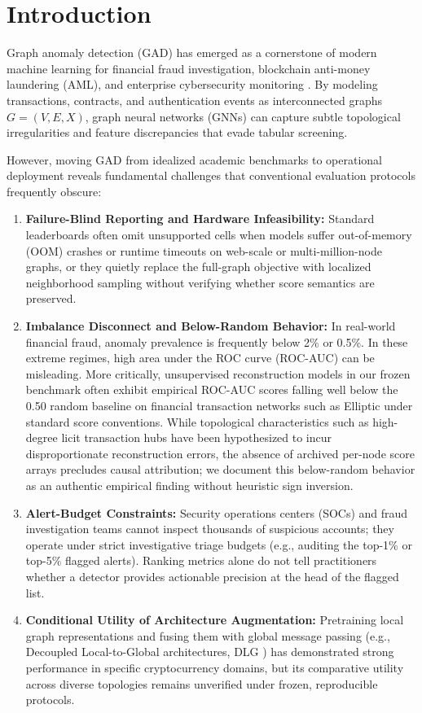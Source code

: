 \documentclass[applsci,article,submit,moreauthors,pdftex]{Definitions/mdpi}
\begin{document}
\section{Introduction}
\label{sec:introduction}
Graph anomaly detection (GAD) has emerged as a cornerstone of modern machine learning for financial fraud investigation, blockchain anti-money laundering (AML), and enterprise cybersecurity monitoring \cite{ma2023survey,qiao2025survey,dilini2026comprehensive}. By modeling transactions, contracts, and authentication events as interconnected graphs $G=(V, E, X)$, graph neural networks (GNNs) can capture subtle topological irregularities and feature discrepancies that evade tabular screening.

However, moving GAD from idealized academic benchmarks to operational deployment reveals fundamental challenges that conventional evaluation protocols frequently obscure:
\begin{enumerate}
    \item \textbf{Failure-Blind Reporting and Hardware Infeasibility:} Standard leaderboards often omit unsupported cells when models suffer out-of-memory (OOM) crashes or runtime timeouts on web-scale or multi-million-node graphs, or they quietly replace the full-graph objective with localized neighborhood sampling without verifying whether score semantics are preserved.
    \item \textbf{Imbalance Disconnect and Below-Random Behavior:} In real-world financial fraud, anomaly prevalence is frequently below 2\% or 0.5\%. In these extreme regimes, high area under the ROC curve (ROC-AUC) can be misleading. More critically, unsupervised reconstruction models in our frozen benchmark often exhibit empirical ROC-AUC scores falling well below the 0.50 random baseline on financial transaction networks such as Elliptic under standard score conventions. While topological characteristics such as high-degree licit transaction hubs have been hypothesized to incur disproportionate reconstruction errors, the absence of archived per-node score arrays precludes causal attribution; we document this below-random behavior as an authentic empirical finding without heuristic sign inversion.
    \item \textbf{Alert-Budget Constraints:} Security operations centers (SOCs) and fraud investigation teams cannot inspect thousands of suspicious accounts; they operate under strict investigative triage budgets (e.g., auditing the top-1\% or top-5\% flagged alerts). Ranking metrics alone do not tell practitioners whether a detector provides actionable precision at the head of the flagged list.
    \item \textbf{Conditional Utility of Architecture Augmentation:} Pretraining local graph representations and fusing them with global message passing (e.g., Decoupled Local-to-Global architectures, DLG \cite{park2026dlg}) has demonstrated strong performance in specific cryptocurrency domains, but its comparative utility across diverse topologies remains unverified under frozen, reproducible protocols.
\end{enumerate}
\end{document}

